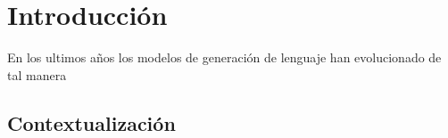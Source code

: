 \chapter{Introducción}
\label{cap:introducion}
\setcounter{page}{1}




En los ultimos años los modelos de generación de lenguaje han evolucionado de tal manera 

\section{Contextualización}
\label{sec:contextualizacion}
